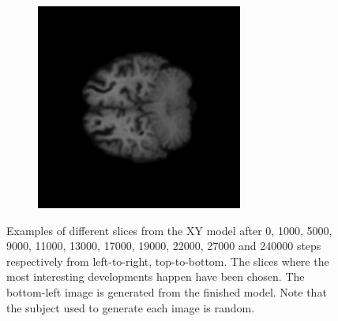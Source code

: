 \documentclass[11pt, fleqn, titlepage]{article}
\newcommand\skipper{1.4pt}
\newcommand{\1}[1]{\mathds{1}\left[#1\right]}
\begin{document}
\begin{figure}[H]
\begin{subfigure}[b]{0.7\textwidth}
		\hskip\skipper
		\includegraphics[width=0.22\linewidth]{imgs/training_progress/XY_model_3T_epoch_1_idx_77000}
	\end{subfigure}
	\caption{Examples of different slices from the XY model after 0, 1000, 5000, 9000, 11000, 13000, 17000, 19000, 22000, 27000 and 240000 steps respectively from left-to-right, top-to-bottom. The slices where the most interesting developments happen have been chosen. The bottom-left image is generated from the finished model. Note that the subject used to generate each image is random.}
	\label{fig:training_progress}
\end{figure}
\end{document}

